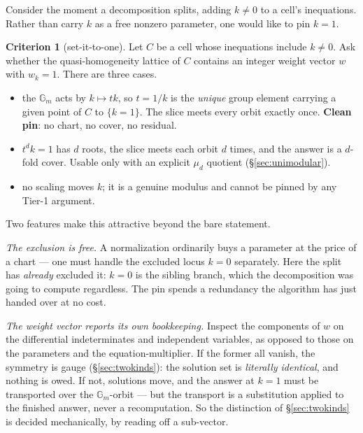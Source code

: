 \documentclass[11pt]{article}
\newcommand{\Gm}{\mathbb{G}_m}
\theoremstyle{plain}
\theoremstyle{definition}
\newtheorem{criterion}[proposition]{Criterion}
\theoremstyle{remark}
\begin{document}
Consider the moment a decomposition splits, adding $k \neq 0$ to a cell's
inequations. Rather than carry $k$ as a free nonzero parameter, one would like
to pin $k = 1$.

\begin{criterion}[set-it-to-one]
\label{crit:setone}
Let $C$ be a cell whose inequations include $k \neq 0$. Ask whether the
quasi-homogeneity lattice of $C$ contains an integer weight vector $w$ with
$w_k = 1$. There are three cases.
\begin{itemize}
\item[$w_k = 1$:] the $\Gm$ acts by $k \mapsto tk$, so $t = 1/k$ is the
      \emph{unique} group element carrying a given point of $C$ to $\{k=1\}$.
      The slice meets every orbit exactly once. \textbf{Clean pin}: no chart,
      no cover, no residual.
\item[$w_k = d$, $|d| > 1$, and no weight-$1$ vector:] $t^d k = 1$ has $d$
      roots, the slice meets each orbit $d$ times, and the answer is a
      $d$-fold cover. Usable only with an explicit $\mu_d$ quotient
      (\S\ref{sec:unimodular}).
\item[$w_k = 0$ forced:] no scaling moves $k$; it is a genuine modulus and
      cannot be pinned by any Tier-1 argument.
\end{itemize}
\end{criterion}

Two features make this attractive beyond the bare statement.

\emph{The exclusion is free.} A normalization ordinarily buys a parameter at
the price of a chart --- one must handle the excluded locus $k = 0$ separately.
Here the split has \emph{already} excluded it: $k = 0$ is the sibling branch,
which the decomposition was going to compute regardless. The pin spends a
redundancy the algorithm has just handed over at no cost.

\emph{The weight vector reports its own bookkeeping.} Inspect the components of
$w$ on the differential indeterminates and independent variables, as opposed to
those on the parameters and the equation-multiplier. If the former all vanish,
the symmetry is gauge (\S\ref{sec:twokinds}): the solution set is
\emph{literally identical}, and nothing is owed. If not, solutions move, and
the answer at $k = 1$ must be transported over the $\Gm$-orbit --- but the
transport is a substitution applied to the finished answer, never a
recomputation. So the distinction of \S\ref{sec:twokinds} is decided
mechanically, by reading off a sub-vector.
\end{document}
